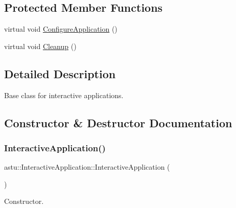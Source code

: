 \subsection*{Protected Member Functions}
\begin{DoxyCompactItemize}
\item 
virtual void \hyperlink{classastu_1_1InteractiveApplication_abec13f308f2a707764a322ecd1bba42d}{Configure\+Application} ()
\item 
virtual void \hyperlink{classastu_1_1InteractiveApplication_a70f5e175ae42b4063358db3787db6bab}{Cleanup} ()
\end{DoxyCompactItemize}


\subsection{Detailed Description}
Base class for interactive applications. 

\subsection{Constructor \& Destructor Documentation}
\mbox{\label{classastu_1_1InteractiveApplication_a047e10af555ee11cddc343e327d9e204}} 
\subsubsection{\texorpdfstring{Interactive\+Application()}{InteractiveApplication()}}
{\footnotesize\ttfamily astu\+::\+Interactive\+Application\+::\+Interactive\+Application (\begin{DoxyParamCaption}{ }\end{DoxyParamCaption})}

Constructor. \mbox{\label{classastu_1_1InteractiveApplication_a02c3cb22049b8565615dc458773ea2b2}} 
